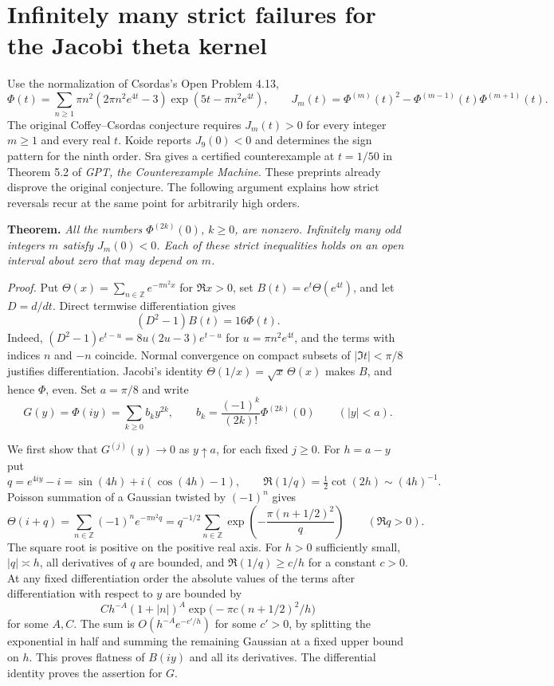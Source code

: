 \documentclass[11pt,a4paper]{article}
\begin{document}
\section{Infinitely many strict failures for the Jacobi theta kernel}\label{sec:strict-kernel}
Use the normalization of Csordas's Open Problem 4.13,
\[
 \Phi(t)=\sum_{n\ge1}\pi n^2(2\pi n^2 e^{4t}-3)
                   \exp(5t-\pi n^2e^{4t}),\qquad
 J_m(t)=\Phi^{(m)}(t)^2-\Phi^{(m-1)}(t)\Phi^{(m+1)}(t).
\]
The original Coffey--Csordas conjecture requires $J_m(t)>0$ for every
integer $m\ge1$ and every real $t$. Koide \cite{sra} reports $J_9(0)<0$ and
determines the sign pattern for the ninth order. Sra gives a certified
counterexample at $t=1/50$ in Theorem 5.2 of \emph{GPT, the Counterexample
Machine}. These preprints already disprove the original conjecture.
The following argument explains how strict reversals recur at the same
point for arbitrarily high orders.

\medskip\noindent
\textbf{Theorem.} \emph{All the numbers $\Phi^{(2k)}(0)$, $k\ge0$, are
nonzero. Infinitely many odd integers $m$ satisfy $J_m(0)<0$.
Each of these strict inequalities holds on an open interval about zero
that may depend on $m$.}

\medskip\noindent
\emph{Proof.}
Put $\Theta(x)=\sum_{n\in\mathbb Z}e^{-\pi n^2x}$ for $\Re x>0$, set
$B(t)=e^t\Theta(e^{4t})$, and let $D=d/dt$. Direct termwise differentiation
gives
\[
 (D^2-1)B(t)=16\Phi(t).
\]
Indeed, $(D^2-1)e^{t-u}=8u(2u-3)e^{t-u}$ for $u=\pi n^2 e^{4t}$,
and the terms with indices $n$ and $-n$ coincide. Normal convergence
on compact subsets of $|\Im t|<\pi/8$ justifies differentiation.
Jacobi's identity $\Theta(1/x)=\sqrt{x}\,\Theta(x)$ makes $B$, and hence
$\Phi$, even. Set $a=\pi/8$ and write
\[
 G(y)=\Phi(iy)=\sum_{k\ge0} b_k y^{2k},\qquad
 b_k=\frac{(-1)^k}{(2k)!}\Phi^{(2k)}(0)\qquad (|y|<a).
\]

We first show that $G^{(j)}(y)\to0$ as $y\uparrow a$, for each fixed
$j\ge0$. For $h=a-y$ put
\[
 q=e^{4iy}-i=\sin(4h)+i(\cos(4h)-1),\qquad
 \Re(1/q)=\tfrac12\cot(2h)\sim (4h)^{-1}.
\]
Poisson summation of a Gaussian twisted by $(-1)^n$ gives
\[
 \Theta(i+q)=\sum_{n\in\mathbb Z}(-1)^n e^{-\pi n^2q}
 =q^{-1/2}\sum_{n\in\mathbb Z}
          \exp\!\left(-\frac{\pi(n+1/2)^2}{q}\right)
 \qquad (\Re q>0).
\]
The square root is positive on the positive real axis.
For $h>0$ sufficiently small, $|q|\asymp h$, all derivatives of $q$
are bounded, and $\Re(1/q)\ge c/h$ for a constant $c>0$.
At any fixed differentiation order the absolute values of the terms
after differentiation with respect to $y$ are bounded by
\[
 C h^{-A}(1+|n|)^A \exp\bigl(-\pi c(n+1/2)^2/h\bigr)
\]
for some $A,C$. The sum is $O(h^{-A}e^{-c'/h})$ for some $c'>0$, by
splitting the exponential in half and summing the remaining Gaussian
at a fixed upper bound on $h$. This proves flatness of $B(iy)$ and all
its derivatives. The differential identity proves the assertion for $G$.
\end{document}
